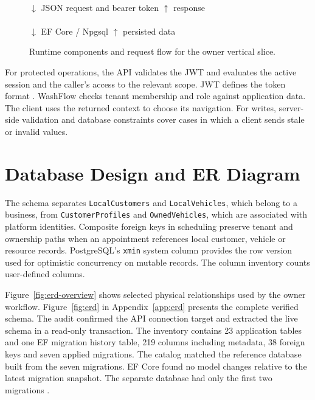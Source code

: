 \documentclass[12pt]{report}
\begin{document}
\begin{figure}[htbp]
\centering
\setlength{\fboxsep}{8pt}
\\[4pt]
\(\downarrow\) \quad JSON request and bearer token \quad \(\uparrow\) response\\[4pt]
\\[4pt]
\(\downarrow\) \quad EF Core / Npgsql \quad \(\uparrow\) persisted data\\[4pt]
\caption{Runtime components and request flow for the owner vertical slice.}
\label{fig:architecture}
\end{figure}

For protected operations, the API validates the JWT and evaluates the active session and the caller's access to the relevant scope. JWT defines the token format \cite{jwt}. WashFlow checks tenant membership and role against application data. The client uses the returned context to choose its navigation. For writes, server-side validation and database constraints cover cases in which a client sends stale or invalid values.

\section{Database Design and ER Diagram}
The schema separates \texttt{LocalCustomers} and \texttt{LocalVehicles}, which belong to a business, from \texttt{CustomerProfiles} and \texttt{OwnedVehicles}, which are associated with platform identities. Composite foreign keys in scheduling preserve tenant and ownership paths when an appointment references local customer, vehicle or resource records. PostgreSQL's \texttt{xmin} system column provides the row version used for optimistic concurrency on mutable records. The column inventory counts user-defined columns.

Figure~\ref{fig:erd-overview} shows selected physical relationships used by the owner workflow. Figure~\ref{fig:erd} in Appendix~\ref{app:erd} presents the complete verified schema. The audit confirmed the API connection target and extracted the live  schema in a read-only transaction. The inventory contains 23 application tables and one EF migration history table, 219 columns including metadata, 38 foreign keys and seven applied migrations. The catalog matched the reference database built from the seven migrations. EF Core found no model changes relative to the latest migration snapshot. The separate  database had only the first two migrations \cite{schemaaudit,pgcatalogs}.
\end{document}
